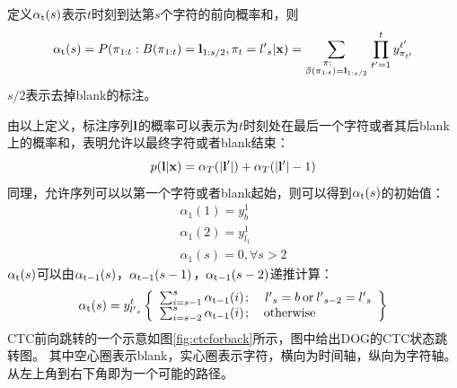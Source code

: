 定义${\alpha _{\rm{t}}}(s)$表示$t$时刻到达第$s$个字符的前向概率和，则
\begin{equation}
{\alpha _{\rm{t}}}(s) = P({\pi _{1:t}}:B({\pi _{1:t}}) = {{\bf{l}}_{1:s/2}},{\pi _t} = {{l'}_s}{\rm{|}}{\bf{x}}{\rm{) = }}\sum\limits_{\scriptstyle{\kern 1pt} {\kern 1pt} {\kern 1pt} {\kern 1pt} {\kern 1pt} {\kern 1pt} {\kern 1pt} {\kern 1pt} {\kern 1pt} {\kern 1pt} {\kern 1pt} {\kern 1pt} {\kern 1pt} {\kern 1pt} \pi :\hfill\atop
\scriptstyle\beta ({\pi _{1:t}}) = {{\bf{l}}_{1:s/2}}\hfill} {\prod\limits_{t' = 1}^t {y_{{\pi _{t'}}}^{t'}} }
\end{equation}
$s/2$表示去掉blank的标注。

由以上定义，标注序列$\bf{l}$的概率可以表示为$t$时刻处在最后一个字符或者其后blank上的概率和，表明允许以最终字符或者blank结束：
\begin{equation}
p({\bf{l}}|{\bf{x}}) = {\alpha _T}(|{\bf{l'}}|) + {\alpha _T}(|{\bf{l'}}| - 1)
\end{equation}
同理，允许序列可以以第一个字符或者blank起始，则可以得到${\alpha _{\rm{t}}}(s)$的初始值：
\begin{equation}
\begin{array}{l}
{\alpha _1}(1) = y_b^1\\
{\alpha _1}(2) = y_{{l_1}}^1\\
{\alpha _1}(s) = 0,\forall s > 2
\end{array}
\end{equation}
${\alpha _{\rm{t}}}(s)$可以由${\alpha _{\rm{t-1}}}(s)$，${\alpha _{\rm{t-1}}}(s-1)$，${\alpha _{\rm{t-1}}}(s-2)$递推计算：
\begin{equation}
\label{equation:alpha}
{\alpha _{\rm{t}}}(s) = y_{{{l'}_s}}^t\left\{ \begin{array}{l}
\sum\nolimits_{i = s - 1}^s {{\alpha _{{\rm{t - 1}}}}(i){\kern 1pt} ;} {\kern 1pt} {\kern 1pt} {\kern 1pt} {\kern 1pt} {\kern 1pt} {\kern 1pt} {\kern 1pt} {\kern 1pt} {\kern 1pt} {\kern 1pt} {\kern 1pt} {\kern 1pt} {\kern 1pt} {{l'}_s} = b{\kern 1pt} {\kern 1pt} {\rm{or}}{\kern 1pt} {\kern 1pt} {{l'}_{s - 2}} = {{l'}_s}\\
\sum\nolimits_{i = s - 2}^s {{\alpha _{{\rm{t - 1}}}}(i){\kern 1pt} ;} {\kern 1pt} {\kern 1pt} {\kern 1pt} {\kern 1pt} {\kern 1pt} {\kern 1pt} {\kern 1pt} {\kern 1pt} {\kern 1pt} {\kern 1pt} {\kern 1pt} {\kern 1pt} {\rm{otherwise}}
\end{array} \right\}
\end{equation}
CTC前向跳转的一个示意如图\ref{fig:ctcforback}所示，图中给出DOG的CTC状态跳转图。
其中空心圈表示blank，实心圈表示字符，横向为时间轴，纵向为字符轴。
从左上角到右下角即为一个可能的路径。


